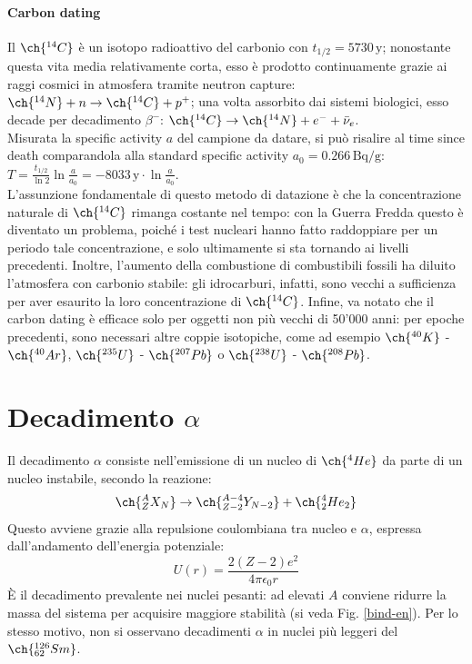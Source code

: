 \paragraph{Carbon dating}

Il $ \ch{^{14}C} $ è un isotopo radioattivo del carbonio con $ t_{1/2} = 5730\,\text{y} $; nonostante questa vita media relativamente corta, esso è prodotto continuamente grazie ai raggi cosmici in atmosfera tramite neutron capture: $ \ch{^{14}N} + n \rightarrow \ch{^{14}C} + p^+ $; una volta assorbito dai sistemi biologici, esso decade per decadimento $ \beta^- $: $ \ch{^{14}C} \rightarrow \ch{^{14}N} + e^- + \bar{\nu}_e $.\\
Misurata la specific activity $ a $ del campione da datare, si può risalire al time since death comparandola alla standard specific activity $ a_0 = 0.266\,\text{Bq}/\text{g} $: $ T = \frac{t_{1/2}}{\ln 2} \ln \frac{a}{a_0} = - 8033\,\text{y} \cdot \ln \frac{a}{a_0} $.\\
L'assunzione fondamentale di questo metodo di datazione è che la concentrazione naturale di $ \ch{^{14}C} $ rimanga costante nel tempo: con la Guerra Fredda questo è diventato un problema, poiché i test nucleari hanno fatto raddoppiare per un periodo tale concentrazione, e solo ultimamente si sta tornando ai livelli precedenti. Inoltre, l'aumento della combustione di combustibili fossili ha diluito l'atmosfera con carbonio stabile: gli idrocarburi, infatti, sono vecchi a sufficienza per aver esaurito la loro concentrazione di $ \ch{^{14}C} $. Infine, va notato che il carbon dating è efficace solo per oggetti non più vecchi di 50'000 anni: per epoche precedenti, sono necessari altre coppie isotopiche, come ad esempio $ \ch{^{40}K} $ - $ \ch{^{40}Ar} $, $ \ch{^{235}U} $ - $ \ch{^{207}Pb} $ o $ \ch{^{238}U} $ - $ \ch{^{208}Pb} $.

\section{Decadimento \texorpdfstring{$ \alpha $}{TEXT}}

Il decadimento $ \alpha $ consiste nell'emissione di un nucleo di $ \ch{^4 He} $ da parte di un nucleo instabile, secondo la reazione:
\begin{equation}
	\ch{^A_Z X_N} \rightarrow \ch{^{A-4}_{Z-2} Y_{N-2}} + \ch{^4_2 He_{2}}
	\label{eq:2.7}
\end{equation}
Questo avviene grazie alla repulsione coulombiana tra nucleo e $ \alpha $, espressa dall'andamento dell'energia potenziale:
\begin{equation}
	U(r) = \frac{2(Z-2)e^2}{4\pi \epsilon_0 r}
	\label{eq:2.8}
\end{equation}
È il decadimento prevalente nei nuclei pesanti: ad elevati $ A $ conviene ridurre la massa del sistema per acquisire maggiore stabilità (si veda Fig. \ref{bind-en}). Per lo stesso motivo, non si osservano decadimenti $ \alpha $ in nuclei più leggeri del $ \ch{^{126}_{62} Sm} $.


